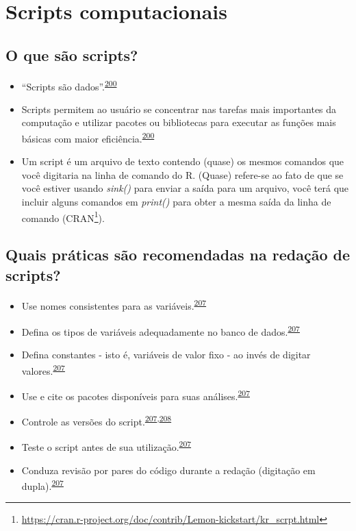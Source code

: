 \documentclass[
  a4paper,
]{book}
\renewcommand{\href}[2]{#2\footnote{\url{#1}}}
\begin{document}
\hypertarget{scripts-computacionais}{%
\section{Scripts computacionais}\label{scripts-computacionais}}

\hypertarget{o-que-suxe3o-scripts}{%
\subsection{O que são scripts?}\label{o-que-suxe3o-scripts}}

\begin{itemize}
\item
  ``Scripts são dados''.\textsuperscript{\protect\hyperlink{ref-hinsen2011}{200}}
\item
  Scripts permitem ao usuário se concentrar nas tarefas mais importantes da computação e utilizar pacotes ou bibliotecas para executar as funções mais básicas com maior eficiência.\textsuperscript{\protect\hyperlink{ref-hinsen2011}{200}}
\item
  Um script é um arquivo de texto contendo (quase) os mesmos comandos que você digitaria na linha de comando do R. (Quase) refere-se ao fato de que se você estiver usando \emph{sink()} para enviar a saída para um arquivo, você terá que incluir alguns comandos em \emph{print()} para obter a mesma saída da linha de comando (\href{https://cran.r-project.org/doc/contrib/Lemon-kickstart/kr_scrpt.html}{CRAN}).
\end{itemize}

\hypertarget{quais-pruxe1ticas-suxe3o-recomendadas-na-redauxe7uxe3o-de-scripts}{%
\subsection{Quais práticas são recomendadas na redação de scripts?}\label{quais-pruxe1ticas-suxe3o-recomendadas-na-redauxe7uxe3o-de-scripts}}

\begin{itemize}
\item
  Use nomes consistentes para as variáveis.\textsuperscript{\protect\hyperlink{ref-SchwabSimon2021}{207}}
\item
  Defina os tipos de variáveis adequadamente no banco de dados.\textsuperscript{\protect\hyperlink{ref-SchwabSimon2021}{207}}
\item
  Defina constantes - isto é, variáveis de valor fixo - ao invés de digitar valores.\textsuperscript{\protect\hyperlink{ref-SchwabSimon2021}{207}}
\item
  Use e cite os pacotes disponíveis para suas análises.\textsuperscript{\protect\hyperlink{ref-SchwabSimon2021}{207}}
\item
  Controle as versões do script.\textsuperscript{\protect\hyperlink{ref-SchwabSimon2021}{207},\protect\hyperlink{ref-Eglen2017}{208}}
\item
  Teste o script antes de sua utilização.\textsuperscript{\protect\hyperlink{ref-SchwabSimon2021}{207}}
\item
  Conduza revisão por pares do código durante a redação (digitação em dupla).\textsuperscript{\protect\hyperlink{ref-SchwabSimon2021}{207}}
\end{itemize}
\end{document}
